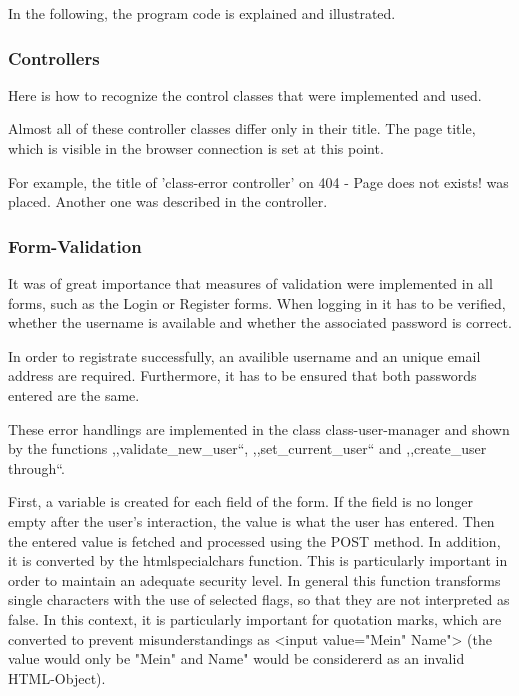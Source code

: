 \documentclass[a4paper,12pt,oneside]{article} %
\begin{document}
In the following, the program code is explained and illustrated.


\subsubsection{Controllers}

Here is how to recognize the control classes that were implemented and used.

Almost all of these controller classes differ only in their title.
The page title, which is visible in the browser connection is \textquotedbl{}set\textquotedbl{}
at this point. 

For example, the title of 'class-error controller' on \textquotedbl{}404
- Page does not exists!\textquotedbl{} was placed. Another one was described
in the controller.


\subsubsection{Form-Validation}

It was of great importance that measures of validation were implemented in all forms, 
such as the Login or Register forms. 
When logging in it has to be verified, whether the username is available and whether the
associated password is correct.

In order to registrate successfully, an availible username and an unique email address are required. 
Furthermore, it has to be ensured that both passwords entered are the same.

These error handlings are implemented in the class \textquotedbl{}class-user-manager\textquotedbl{}
and shown by the functions ,,validate\_new\_user``, ,,set\_current\_user``
and ,,create\_user through``.

First, a variable is created for each field of the form. If the field is no longer empty after the user's interaction, the value is what the user has entered. Then the entered value is fetched and processed using the POST method. In addition, it is converted by the htmlspecialchars function. This is particularly important in order to maintain an adequate security level. In general this function transforms single characters with the use of selected flags, so that they are not interpreted as false. In this context, it is particularly important for quotation marks, which are converted to prevent misunderstandings as <input value="Mein" Name"> (the value would only be "Mein" and Name" would be considererd as an invalid HTML-Object).
\end{document}
